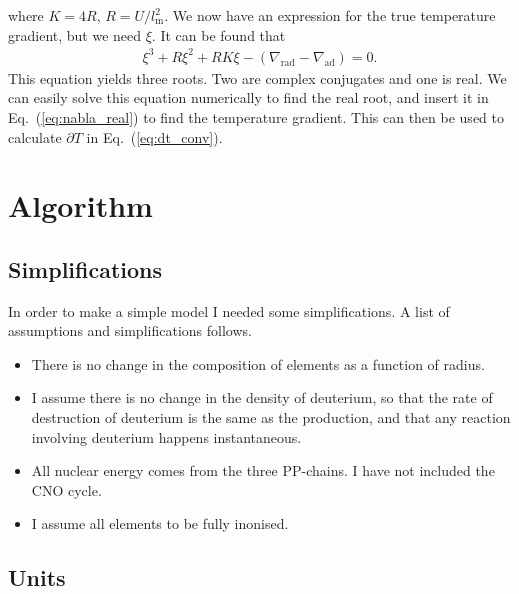 \documentclass[a4paper, 11pt, english]{article}
\newcommand{\refeq}[1]{(\textcolor{red}{\ref{eq:#1}})} %
\begin{document}
where $K = 4R$, $R = U/l_{\mathrm{m}}^2$. We now have an expression for the true
temperature gradient, but we need $\xi$. It can be found that
\begin{align*}
	\xi^3 + R\xi^2 + RK\xi - (\nabla_{\mathrm{rad}} - \nabla_{\mathrm{ad}}) = 0.
\end{align*}
This equation yields three roots. Two are complex conjugates and one is real. We can
easily solve this equation numerically to find the real root, and insert it in
Eq.~\refeq{nabla_real} to find the temperature gradient. This can then be used to
calculate $\partial T$ in Eq.~\refeq{dt_conv}.

\section{Algorithm}
\subsection{Simplifications}

In order to make a simple model I needed some simplifications. A list of
assumptions and simplifications follows.
\begin{itemize}
	\item[\textbullet] There is no change in the composition of elements as a function of
		radius. 
	\item[\textbullet] I assume there is no change in the density of deuterium, so that
		the rate of destruction of deuterium is the same as the production, and that any
		reaction involving deuterium happens instantaneous.
	\item[\textbullet] All nuclear energy comes from the three PP-chains. I have not
		included the CNO cycle.
	\item[\textbullet] I assume all elements to be fully inonised.
\end{itemize}

\subsection{Units}
\end{document}
